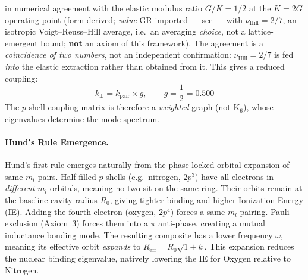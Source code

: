 in numerical agreement with the elastic modulus ratio $G/K = 1/2$
at the $K = 2G$ operating point (form-derived; \emph{value} GR-imported ---
see  --- with
$\nu_{\text{Hill}} = 2/7$, an isotropic Voigt--Reuss--Hill average, i.e.\ an averaging
\emph{choice}, not a lattice-emergent bound; \textbf{not} an axiom of this framework).
The agreement is a \emph{coincidence of two numbers}, not an independent confirmation:
$\nu_{\text{Hill}} = 2/7$ is fed \emph{into} the elastic extraction rather than obtained from it.
This gives a reduced coupling:
\begin{equation}
    k_{\perp} = k_{\text{pair}} \times g, \qquad
    g = \frac{1}{2} = 0.500
    \label{eq:k_perp}
\end{equation}
The $p$-shell coupling matrix is therefore a \emph{weighted} graph
(not $\mathrm{K}_6$), whose eigenvalues determine the mode spectrum.

\paragraph{Hund's Rule Emergence.}
Hund's first rule emerges naturally from the phase-locked orbital expansion
of same-$m_l$ pairs. Half-filled $p$-shells (e.g.\ nitrogen, $2p^3$) have all
electrons in \emph{different} $m_l$ orbitals, meaning no two sit on the same ring.
Their orbits remain at the baseline cavity radius $R_0$, giving tighter binding
and higher Ionization Energy (IE).
Adding the fourth electron (oxygen, $2p^4$) forces a same-$m_l$ pairing.
Pauli exclusion (Axiom~3) forces them into a $\pi$ anti-phase, creating a mutual inductance
bonding mode. The resulting composite has a lower frequency $\omega$,
meaning its effective orbit \emph{expands} to $R_{\text{eff}} = R_0 \sqrt{1+k}$.
This expansion reduces the nuclear binding eigenvalue, natively lowering the IE
for Oxygen relative to Nitrogen.


